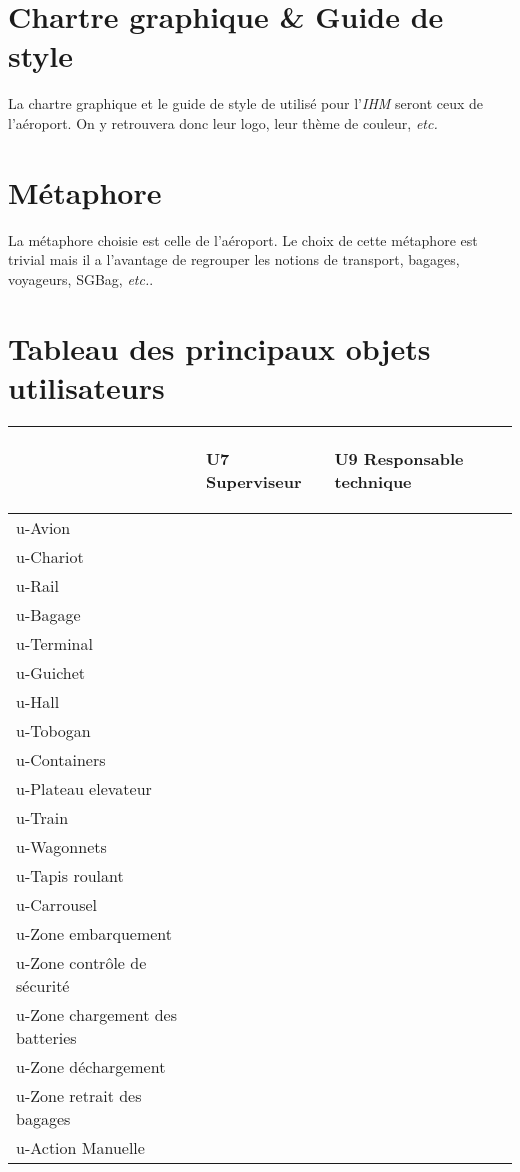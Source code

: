 \section{Chartre graphique \& Guide de style}
La chartre graphique et le guide de style de utilisé pour l'\textsl{IHM} seront ceux de l'aéroport. On y retrouvera donc leur logo, leur thème de couleur, \textsl{etc.}

\section{Métaphore}
La métaphore choisie est celle de \og l'aéroport\fg. Le choix de cette métaphore est trivial mais il a l'avantage de regrouper les notions de \og transport, bagages, voyageurs, SGBag, \textsl{etc.}\fg.

\section{Tableau des principaux objets utilisateurs}
\providecommand{\DJSPU}[1]{}

\begin {tabular} {| l | l | l |}
\hline
~
&\begin{sideways}U7 Superviseur\end{sideways}
&\begin{sideways}U9 Responsable technique~\end{sideways}\\
\hline
u-Avion  & & \\
\hline
u-Chariot  & & \\
\hline
u-Rail & & \\
\hline
u-Bagage  & & \\
\hline
u-Terminal  & & \\
\hline
u-Guichet  & & \\
\hline
u-Hall  & & \\
\hline
u-Tobogan  & & \\
\hline
u-Containers  & & \\
\hline
u-Plateau elevateur  & & \\
\hline
u-Train  & & \\
\hline
u-Wagonnets  & & \\
\hline
u-Tapis roulant  & & \\
\hline
u-Carrousel  & & \\
\hline
u-Zone embarquement  & & \\
\hline
u-Zone contrôle de sécurité  & & \\
\hline
u-Zone chargement des batteries  & & \\
\hline
u-Zone déchargement  & & \\
\hline
u-Zone retrait des bagages  & & \\
\hline
u-Action Manuelle & & \\
\hline
\end {tabular}
